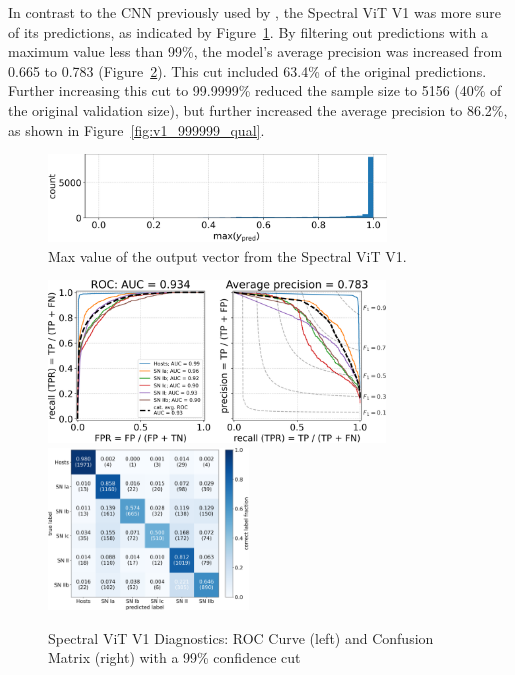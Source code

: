 In contrast to the CNN previously used by \textcite{Sepeku2022}, the Spectral ViT V1 
was more sure of its predictions, as indicated by Figure~\ref{fig:v1_max}. By filtering 
out predictions with a maximum value less than 99\%, the model's average precision 
was increased from 0.665 to 0.783 (Figure~\ref{fig:v1_99_qual}). This cut included 
63.4\% of the original predictions. Further increasing this cut to 99.9999\% reduced 
the sample size to 5156 (40\% of the original validation size), but further increased the 
average precision to 86.2\%, as shown in Figure~\ref{fig:v1_999999_qual}.  
\begin{figure}[t]
    \centering
    \includegraphics[width=0.8\textwidth]{figures/v1_real/vit_model_V1_original_redomax_ypred_binary_31.png}
    \caption[Spectral ViT V1 Confidence]{Max value of the output vector from the Spectral ViT V1.\label{fig:v1_max}}
\end{figure}

\begin{figure}[b]
    \centering
    \includegraphics[height=4.3cm]{figures/v1_real/vit_model_V1_original_redoroc99_e31.png}
    \quad
    \includegraphics[height=4.3cm]{figures/v1_real/vit_model_V1_original_redocm99_e31.png}
    \caption[Spectral ViT V1 Diagnostics: 99\% Cut]{Spectral ViT V1 Diagnostics: ROC Curve (left) and Confusion Matrix (right) with a 99\% confidence
    cut \label{fig:v1_99_qual}}
\end{figure}

